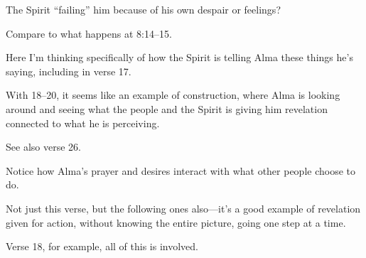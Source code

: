 \begin{compactdesc}
\begin{compactitem}
				\end{compactitem}
			\item[{\hyperref[ALMA-4-15]{Alma 4:15}}] \phantom{.}
				\begin{compactitem}
					\item The Spirit ``failing'' him because of his own despair or feelings?
					\item Compare to what happens at 8:14--15.
				\end{compactitem}
			\item[{\hyperref[ALMA-4-19]{Alma 4:19--20}}]
			\item[{\hyperref[ALMA-5-45]{Alma 5:45--48}}]
			\item[{\hyperref[ALMA-6-8]{Alma 6:8}}]
			\item[{\hyperref[ALMA-7-4]{Alma 7:4--5}}]
			\item[{\hyperref[ALMA-7-8]{Alma 7:8--9}}]
			\item[{\hyperref[ALMA-7-11]{Alma 7:11--13}}]
			\item[{\hyperref[ALMA-7-14]{Alma 7:14--17}}] \phantom{.}
				\begin{compactitem}
					\item Here I'm thinking specifically of how the Spirit is telling Alma these things he's saying, including in verse 17.
					\item With 18--20, it seems like an example of construction, where Alma is looking around and seeing what the people and the Spirit is giving him revelation connected to what he is perceiving.
					\item See also verse 26.
				\end{compactitem}
			\item[{\hyperref[ALMA-8-10]{Alma 8:10--11}}] \phantom{.}
				\begin{compactitem}
					\item Notice how Alma's prayer and desires interact with what other people choose to do.
				\end{compactitem}
			\item[{\hyperref[ALMA-8-14]{Alma 8:14}}] \phantom{.}
				\begin{compactitem}
					\item Not just this verse, but the following ones also---it's a good example of revelation given for action, without knowing the entire picture, going one step at a time.
					\item Verse 18, for example, all of this is involved.
				\end{compactitem}

\end{compactdesc}
